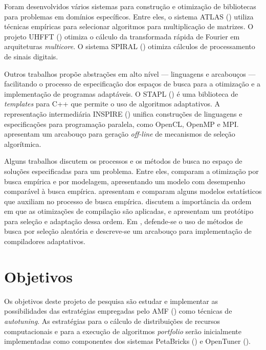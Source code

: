 \documentclass[a4paper, 11pt]{article}
\begin{document}
Foram desenvolvidos vários sistemas para construção e otimização de bibliotecas
para problemas em domínios específicos. Entre eles, o sistema ATLAS 
(\citet{whaley1998, whaley2005}) utiliza técnicas empíricas para selecionar
algoritmos para multiplicação de matrizes. O projeto UHFFT 
(\citet{ali2007scheduling}) otimiza o cálculo da transformada rápida
de Fourier em arquiteturas \emph{multicore}. O sistema SPIRAL 
(\citet{puschel2005spiral}) otimiza cálculos de processamento de sinais
digitais.

Outros trabalhos propõe abstrações em alto nível --- linguagens e arcabouços 
--- facilitando o processo de especificação dos espaços de busca para a 
otimização e a implementação de programas adaptáveis. O STAPL 
(\citet{thomas2005stapl}) é uma biblioteca de \emph{templates} para C++
que permite o uso de algoritmos adaptativos. A representação intermediária
INSPIRE (\citet{jordan2013inspire}) unifica construções de linguagens e 
especificações para programação paralela, como OpenCL, OpenMP e MPI.
\citet{yu2004adaptive} apresentam um arcabouço para geração \emph{off-line}
de mecanismos de seleção algorítmica.

Alguns trabalhos discutem os processos e os métodos de busca no espaço
de soluções especificadas para um problema. Entre eles,
\citet{yotov2003} comparam a otimização por busca empírica e por 
modelagem, apresentando um modelo com desempenho comparável à busca empírica.
\citet{vuduc2004} apresentam e comparam alguns
modelos estatísticos que auxiliam no processo de busca empírica.
\citet{cooper2002compilation} discutem a importância da
ordem em que as otimizações de compilação são aplicadas, e apresentam
um protótipo para seleção e adaptação dessa ordem.
Em \citet{cooper2002adaptive}, defende-se o uso de métodos de busca
por seleção aleatória e descreve-se um arcabouço para implementação
de compiladores adaptativos.

\section{Objetivos} \label{sec:obj}

Os objetivos deste projeto de pesquisa são estudar e implementar as 
possibilidades das estratégias empregadas pelo AMF 
(\citet{goldman2012framework}) como técnicas de \emph{autotuning}. 
As estratégias para o cálculo de distribuições de recursos computacionais 
e para a execução de algoritmos \emph{portfolio} serão inicialmente 
implementadas como componentes dos sistemas PetaBricks (\citet{ansel2014phd}) e
OpenTuner (\citet{ansel2013opentuner}). 
\end{document}
